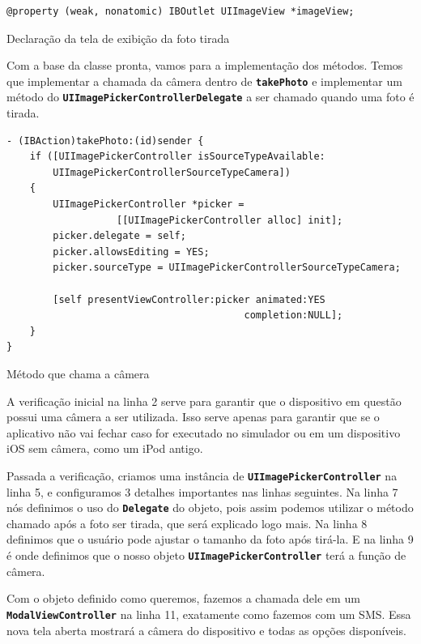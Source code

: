 \documentclass[a4paper,12pt,brazil,doubleside]{book}
\begin{document}
\begin{singlespace}
\begin{listing}[H]
\begin{verbatim}
@property (weak, nonatomic) IBOutlet UIImageView *imageView;
\end{verbatim}
\caption{Declaração da tela de exibição da foto tirada}
\end{listing}


Com a base da classe pronta, vamos para a implementação dos métodos. Temos que implementar a chamada da câmera dentro de \texttt{\textbf{takePhoto}} e implementar um método do \texttt{\textbf{UIImagePickerControllerDelegate}} a ser chamado quando uma foto é tirada.

\begin{listing}[H]
\begin{verbatim}
- (IBAction)takePhoto:(id)sender {
    if ([UIImagePickerController isSourceTypeAvailable:
        UIImagePickerControllerSourceTypeCamera])
    {
        UIImagePickerController *picker =
                   [[UIImagePickerController alloc] init];
        picker.delegate = self;
        picker.allowsEditing = YES;
        picker.sourceType = UIImagePickerControllerSourceTypeCamera;
        
        [self presentViewController:picker animated:YES
                                         completion:NULL];
    }
}
\end{verbatim}
\caption{Método que chama a câmera}
\end{listing}


A verificação inicial na linha 2 serve para garantir que o dispositivo em questão possui uma câmera a ser utilizada. Isso serve apenas para garantir que se o aplicativo não vai fechar caso for executado no simulador ou em um dispositivo iOS sem câmera, como um iPod antigo.

Passada a verificação, criamos uma instância de \texttt{\textbf{UIImagePickerController}} na linha 5, e configuramos 3 detalhes importantes nas linhas seguintes. Na linha 7 nós definimos o uso do \texttt{\textbf{Delegate}} do objeto, pois assim podemos utilizar o método chamado após a foto ser tirada, que será explicado logo mais. Na linha 8 definimos que o usuário pode ajustar o tamanho da foto após tirá-la. E na linha 9 é onde definimos que o nosso objeto \texttt{\textbf{UIImagePickerController}} terá a função de câmera.

Com o objeto definido como queremos, fazemos a chamada dele em um\\ \texttt{\textbf{ModalViewController}} na linha 11, exatamente como fazemos com um SMS. Essa nova tela aberta mostrará a câmera do dispositivo e todas as opções disponíveis.


\end{singlespace}
\end{document}
